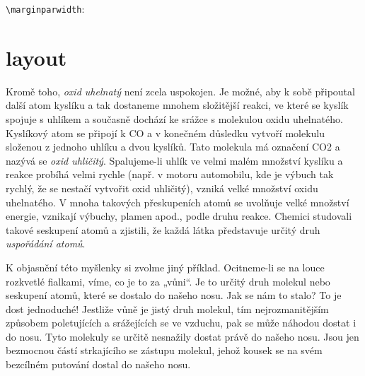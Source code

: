 \documentclass[
  paper=157.794mm:210.392mm,
  DIV=36,
  headinclude=false
]{scrbook}
\begin{document}

  \verb|\marginparwidth|: \prntlen{\marginparwidth}

  \pagediagram
  \chapter{layout}
  \layout


  Kromě toho, \emph{oxid uhelnatý} není zcela uspokojen. Je možné, aby k sobě připoutal další atom
  kyslíku a tak dostaneme mnohem složitější reakci, ve které se kyslík spojuje s uhlíkem a současně
  dochází ke srážce s molekulou oxidu uhelnatého. Kyslíkový atom se připojí k CO a v konečném
  důsledku vytvoří molekulu složenou z jednoho uhlíku a dvou kyslíků. Tato molekula má označení CO2
  a nazývá se \emph{oxid uhličitý}. Spalujeme-li uhlík ve velmi malém množství kyslíku a reakce
  probíhá velmi rychle (např. v motoru automobilu, kde je výbuch tak rychlý, že se nestačí vytvořit
  oxid uhličitý), vzniká velké množství oxidu uhelnatého. V mnoha takových přeskupeních atomů se
  uvolňuje velké množství energie, vznikají výbuchy, plamen apod., podle druhu reakce. Chemici
  studovali takové seskupení atomů a zjistili, že každá látka představuje určitý druh
  \emph{uspořádání atomů}.

  K objasnění této myšlenky si zvolme jiný příklad. Ocitneme-li se na louce rozkvetlé fialkami,
  víme, co je to za „vůni“. Je to určitý druh molekul nebo seskupení atomů, které se dostalo do
  našeho nosu. Jak se nám to stalo? To je dost jednoduché! Jestliže vůně je jistý druh molekul, tím
  nejrozmanitějším způsobem poletujících a srážejících se ve vzduchu, pak se může náhodou dostat i
  do nosu. Tyto molekuly se určitě nesnažily dostat právě do našeho nosu. Jsou jen bezmocnou částí
  strkajícího se zástupu molekul, jehož kousek se na svém bezcílném putování dostal do našeho nosu.
  
\end{document}
